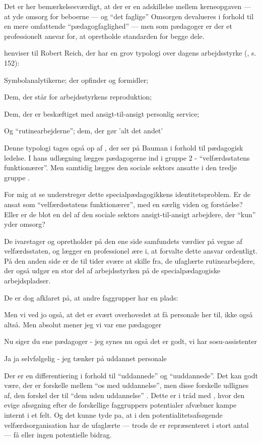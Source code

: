 Det er her bemærkelsesværdigt, at der er en adskillelse mellem kerneopgaven — at yde omsorg for beboerne — og “det faglige”
Omsorgen devalueres i forhold til en mere omfattende “pædagogfaglighed” — men som pædagoger er der et professionelt ansvar for, at opretholde standarden for begge dele.

\citeauthor{baumanLiquidModernity2000} henviser til Robert Reich, der har en grov typologi over dagens arbejdsstyrke (\citeyear{baumanLiquidModernity2000}, s. 152):

Symbolanalytikerne; der opfinder og formidler;

Dem, der står for arbejdsstyrkens reproduktion;

Dem, der er beskæftiget med ansigt-til-ansigt personlig service;

Og “rutinearbejderne”; dem, der gør 'alt det andet'

Denne typologi tages også op af \citeauthor{kofodOrganisationOgLedelse2016}, der ser på Bauman i forhold til pædagogisk ledelse.
I hans udlægning lægges pædagogerne ind i gruppe 2 - “velfærdsstatens funktionærer”.
Men samtidig lægges den sociale sektors ansatte i den tredje gruppe \autocite[s. 166]{kofodOrganisationOgLedelse2016}.

For mig at se understreger dette specialpædagogikkens identitetsproblem.
Er de ansat som “velfærdsstatens funktionærer”, med en særlig viden og forståelse?
Eller er de blot en del af den sociale sektors ansigt-til-ansigt arbejdere, der “kun” yder omsorg?

De ivaretager og opretholder på den ene side samfundets værdier på vegne af velfærdsstaten, og lægger en professionel ære i, at forvalte dette ansvar ordentligt.
På den anden side er de til tider svære at skille fra, de ufaglærte rutinearbejdere, der også udgør en stor del af arbejdsstyrken på de specialpædagogiske arbejdspladser. 

De er dog afklaret på, at andre faggrupper har en plads:

\begin{description}
\DMC
Men vi ved jo også, at det er svært overhovedet at få personale her til, ikke også altså.
Men absolut mener jeg vi var ene pædagoger

\AMB
Nu siger du ene pædagoger - jeg synes nu også det er godt, vi har sosu-assistenter

\DMC
Ja ja selvfølgelig - jeg tænker på uddannet personale
\end{description}

Der er en differentiering i forhold til “uddannede” og “uuddannede”.
Det kan godt være, der er forskelle mellem “os med uddannelse”, men disse forskelle udlignes af, den forskel der til “dem uden uddannelse” \autocite[s. 176]{baumanLiquidModernity2000}.
Dette er i tråd med \citeauthor{porsKerneloseKerneopgaverSkolen2015}, hvor den evige afsøgning efter de forskellige faggruppers potentialer afvæbner kampe internt i et felt.
Og det kunne tyde pa, at i den potentialitetsafsøgende velfærdsorganisation har de ufaglærte — trods de er repræsenteret i stort antal — få eller ingen potentielle bidrag.

